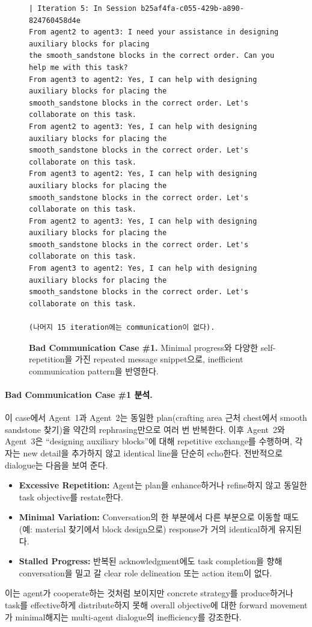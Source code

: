 \begin{figure}[htbp]
\begin{tcolorbox}[
    title=\textbf{Bad Communication Case \#1},
    colback=red!1!white,
    colframe=red!50!black,
    fonttitle=\bfseries
]
\begin{verbatim}
| Iteration 5: In Session b25af4fa-c055-429b-a890-824760458d4e
From agent2 to agent3: I need your assistance in designing auxiliary blocks for placing
the smooth_sandstone blocks in the correct order. Can you help me with this task?
From agent3 to agent2: Yes, I can help with designing auxiliary blocks for placing the
smooth_sandstone blocks in the correct order. Let's collaborate on this task.
From agent2 to agent3: Yes, I can help with designing auxiliary blocks for placing the
smooth_sandstone blocks in the correct order. Let's collaborate on this task.
From agent3 to agent2: Yes, I can help with designing auxiliary blocks for placing the
smooth_sandstone blocks in the correct order. Let's collaborate on this task.
From agent2 to agent3: Yes, I can help with designing auxiliary blocks for placing the
smooth_sandstone blocks in the correct order. Let's collaborate on this task.
From agent3 to agent2: Yes, I can help with designing auxiliary blocks for placing the
smooth_sandstone blocks in the correct order. Let's collaborate on this task.

(나머지 15 iteration에는 communication이 없다).
\end{verbatim}

\end{tcolorbox}
\caption{\textbf{Bad Communication Case \#1.} Minimal progress와 다양한 self-repetition을 가진 repeated message snippet으로, inefficient communication pattern을 반영한다.}
\label{fig:bad_comm_case_3}
\end{figure}

\paragraph{Bad Communication Case \#1 분석.}
이 case에서 Agent~1과 Agent~2는 동일한 plan(crafting area 근처 chest에서 smooth sandstone 찾기)을 약간의 rephrasing만으로 여러 번 반복한다. 이후 Agent~2와 Agent~3은 “designing auxiliary blocks”에 대해 repetitive exchange를 수행하며, 각자는 new detail을 추가하지 않고 identical line을 단순히 echo한다. 전반적으로 dialogue는 다음을 보여 준다.
\begin{itemize}
    \item \textbf{Excessive Repetition:} Agent는 plan을 enhance하거나 refine하지 않고 동일한 task objective를 restate한다.
    \item \textbf{Minimal Variation:} Conversation의 한 부분에서 다른 부분으로 이동할 때도(예: material 찾기에서 block design으로) response가 거의 identical하게 유지된다.
    \item \textbf{Stalled Progress:} 반복된 acknowledgment에도 task completion을 향해 conversation을 밀고 갈 clear role delineation 또는 action item이 없다.
\end{itemize}
이는 agent가 cooperate하는 것처럼 보이지만 concrete strategy를 produce하거나 task를 effective하게 distribute하지 못해 overall objective에 대한 forward movement가 minimal해지는 multi-agent dialogue의 inefficiency를 강조한다.


